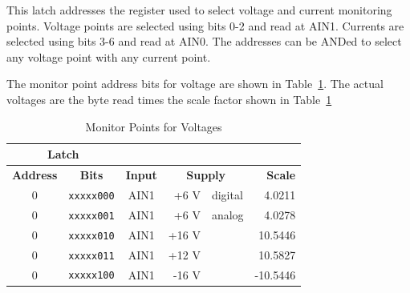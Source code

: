\documentclass[letterpaper,11pt]{book}
\begin{document}
This latch addresses the register used to select voltage and current monitoring
points.  Voltage points are
selected using bits 0-2 and read at AIN1.  Currents are selected using bits
3-6 and read at AIN0.  The addresses can be ANDed to select any voltage point
with any current point.  

The monitor point address bits for voltage are shown in Table~\ref{tab:volt-mon}. 
The actual voltages are the byte read times the scale factor shown in 
Table~\ref{tab:volt-mon}
\begin{table}[h!tb]
  \begin{center}
    \caption{\label{tab:volt-mon}Monitor Points for Voltages}
    \begin{tabular}{|c|c|c|rl|r|}
    \hline
\multicolumn{2}{|c|}{\bf Latch} & \multicolumn{4}{c|}{ } \\ 
\hline  
{\bf Address} & {\bf Bits}      & {\bf Input}  & \multicolumn{2}{c|}{\bf Supply }  & {\bf Scale} \\
\hline
0       & {\tt xxxxx000}  & AIN1 &  +6 V & digital        &   4.0211 \\
0       & {\tt xxxxx001}  & AIN1 &  +6 V & analog         &   4.0278 \\
0       & {\tt xxxxx010}  & AIN1 & +16 V &                &  10.5446 \\
0       & {\tt xxxxx011}  & AIN1 & +12 V &                &  10.5827 \\
0       & {\tt xxxxx100}  & AIN1 & -16 V &                & -10.5446 \\
\hline
    \end{tabular}
  \end{center}
\end{table}
\end{document}
